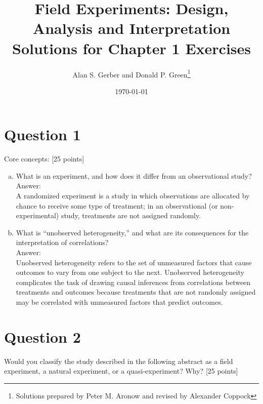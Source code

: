 \documentclass[11pt,notitlepage]{article}		%
\title{Field Experiments: Design, Analysis and Interpretation \\
Solutions for Chapter 1 Exercises}
\author{Alan S. Gerber and Donald P. Green\footnote{Solutions prepared by Peter M. Aronow and revised by Alexander Coppock}}
\date{\today}
\begin{document}
\maketitle


\section*{Question 1}
Core concepts: [25 points]

\begin{enumerate}[a)]
\item What is an experiment, and how does it differ from an observational study?  \\
Answer:\\
A randomized experiment is a study in which observations are allocated by chance to receive some type of treatment; in an observational (or non-experimental) study, treatments are not assigned randomly.

\item What is ``unobserved heterogeneity,'' and what are its consequences for the interpretation of correlations? \\
Answer:\\
Unobserved heterogeneity refers to the set of unmeasured factors that cause outcomes to vary from one subject to the next. Unobserved heterogeneity complicates the task of drawing causal inferences from correlations between treatments and outcomes because treatments that are not randomly assigned may be correlated with unmeasured factors that predict outcomes.  
\end{enumerate}

\section*{Question 2}
Would you classify the study described in the following abstract as a field experiment, a natural experiment, or a quasi-experiment? Why? [25 points]
\end{document}
